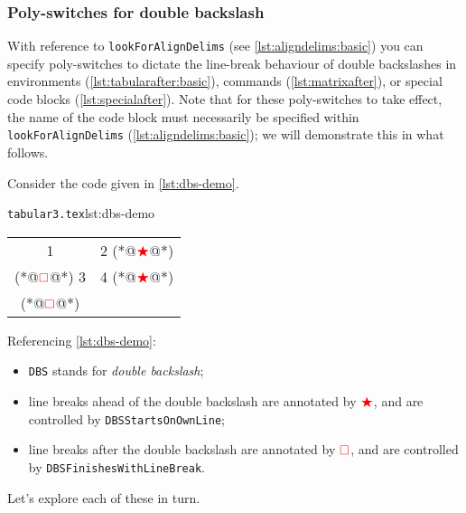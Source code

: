 \subsubsection{Poly-switches for double backslash}\label{subsec:dbs}
 With reference to \texttt{lookForAlignDelims} (see \vref{lst:aligndelims:basic})
  you can specify poly-switches to
 dictate the line-break behaviour of double backslashes in environments
 (\vref{lst:tabularafter:basic}), commands (\vref{lst:matrixafter}), or special code
 blocks (\vref{lst:specialafter}). Note that for these poly-switches to take effect, the
 name of the code block must necessarily be specified within \texttt{lookForAlignDelims}
 (\vref{lst:aligndelims:basic}); we will demonstrate this in what follows.

 Consider the code given in \cref{lst:dbs-demo}.
 \begin{cmhlistings}[style=tcblatex,escapeinside={(*@}{@*)}]{\texttt{tabular3.tex}}{lst:dbs-demo}
\begin{tabular}{cc}
 1 & 2 (*@$\color{red}\bigstar$@*)\\(*@$\color{red}\square$@*) 3 & 4 (*@$\color{red}\bigstar$@*)\\(*@$\color{red}\square$@*)
\end{tabular}
\end{cmhlistings}
 Referencing \cref{lst:dbs-demo}:
 \begin{itemize}
  \item \texttt{DBS} stands for \emph{double backslash};
  \item line breaks ahead of the double backslash are annotated by
        $\color{red}\bigstar$, and are controlled by \texttt{DBSStartsOnOwnLine};
  \item line breaks after the double backslash are annotated by
        $\color{red}\square$, and are controlled by
        \texttt{DBSFinishesWithLineBreak}.
 \end{itemize}

 Let's explore each of these in turn.

